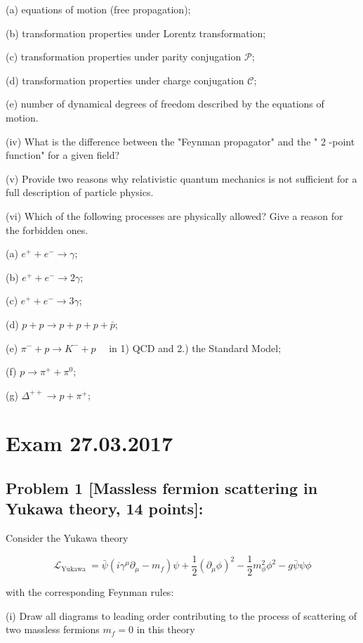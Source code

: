 \documentclass[10pt, letterpaper]{article}
\begin{document}
(a) equations of motion (free propagation);

(b) transformation properties under Lorentz transformation;

(c) transformation properties under parity conjugation $\mathcal{P}$;

(d) transformation properties under charge conjugation $\mathcal{C}$;

(e) number of dynamical degrees of freedom described by the equations of motion.

(iv) What is the difference between the "Feynman propagator" and the " 2 -point function" for a given field?

(v) Provide two reasons why relativistic quantum mechanics is not sufficient for a full description of particle physics.

(vi) Which of the following processes are physically allowed? Give a reason for the forbidden ones.

(a) $e^{+}+e^{-} \rightarrow \gamma$;

(b) $e^{+}+e^{-} \rightarrow 2 \gamma$;

(c) $e^{+}+e^{-} \rightarrow 3 \gamma$;

(d) $p+p \rightarrow p+p+p+\bar{p}$;

(e) $\pi^{-}+p \rightarrow K^{-}+p \quad$ in 1) QCD and 2.) the Standard Model;

(f) $p \rightarrow \pi^{+}+\pi^0$;

(g) $\Delta^{++} \rightarrow p+\pi^{+}$;



\pagebreak

\section{Exam 27.03.2017}


\subsection{Problem 1 [Massless fermion scattering in Yukawa theory, 14 points]:}

Consider the Yukawa theory

$$
\mathcal{L}_{\text {Yukawa }}=\bar{\psi}\left(i \gamma^\mu \partial_\mu-m_f\right) \psi+\frac{1}{2}\left(\partial_\mu \phi\right)^2-\frac{1}{2} m_\phi^2 \phi^2-g \bar{\psi} \psi \phi
$$

with the corresponding Feynman rules:

(i) Draw all diagrams to leading order contributing to the process of scattering of two massless fermions $m_f=0$ in this theory
\end{document}
